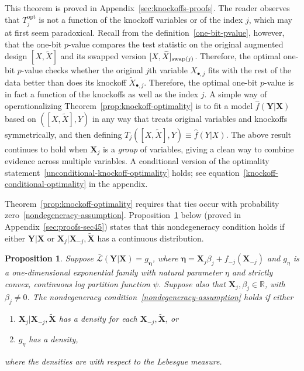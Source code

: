 \documentclass[12pt]{article}
\newtheorem{proposition}{Proposition}
\theoremstyle{definition}
\theoremstyle{remark}
\newcommand{\prx}{\bm X}
\newcommand{\srx}{X}
\newcommand{\prxk}{{{\widetilde{\bm X}}}}
\newcommand{\srxk}{\widetilde X}
\newcommand{\pry}{{\bm Y}}
\newcommand{\sry}{Y}
\begin{document}
This theorem is proved in Appendix~\ref{sec:knockoffs-proofs}. The reader observes that $T_j^{\text{opt}}$ is not a function of the knockoff variables or of the index $j$, which may at first seem paradoxical. Recall from the definition~\eqref{one-bit-pvalue}, however, that the one-bit $p$-value compares the test statistic on the original augmented design $[\srx, \srxk]$ and its swapped version $[\srx, \srxk]_{\textnormal{swap}(j)}$. Therefore, the optimal one-bit $p$-value checks whether the original $j$th variable $\srx_{\bullet, j}$ fits with the rest of the data better than does its knockoff $\srxk_{\bullet, j}$. Therefore, the optimal one-bit $p$-value is in fact a function of the knockoffs as well as the index $j$. A simple way of operationalizing Theorem~\ref{prop:knockoff-optimality} is to fit a model $\widehat f(\pry|\prx)$ based on $([\srx, \srxk], \sry)$ in any way that treats original variables and knockoffs symmetrically, and then defining $T_j([\srx, \srxk], \sry) \equiv \widehat f(\sry|\srx)$. The above result continues to hold when $\prx_j$ is a \textit{group} of variables, giving a clean way to combine evidence across multiple variables. A conditional version of the optimality statement~\eqref{unconditional-knockoff-optimality} holds; see equation~\eqref{knockoff-conditional-optimality} in the appendix.


Theorem~\ref{prop:knockoff-optimality} requires that ties occur with probability zero~\eqref{nondegeneracy-assumption}. Proposition~\ref{prop:nondegeneracy-knockoffs} below (proved in Appendix~\ref{sec:proofs-sec45}) states that this nondegeneracy condition holds if either $\pry|\prx$ or $\prx_j|\prx_{-j}, \prxk$ has a continuous distribution.
\begin{proposition}\label{prop:nondegeneracy-knockoffs}
	Suppose $\bar{\mathcal L}(\pry|\prx) = g_{\bm\eta}$, where $\bm \eta = \prx_j \beta_j + f_{-j}(\prx_{-j})$ and $g_\eta$ is a one-dimensional exponential family with natural parameter $\eta$ and strictly convex, continuous log partition function $\psi$. Suppose also that $\prx_j, \beta_j \in \mathbb R$, with $\beta_j \neq 0$. The nondegeneracy condition~\eqref{nondegeneracy-assumption} holds if either 
	\begin{enumerate}
		\item $\prx_{j}|\prx_{-j}, \prxk$ has a density for each $\prx_{-j}, \prxk$, or
		\item $g_\eta$ has a density,
	\end{enumerate}
	where the densities are with respect to the Lebesgue measure.
\end{proposition}
\end{document}
